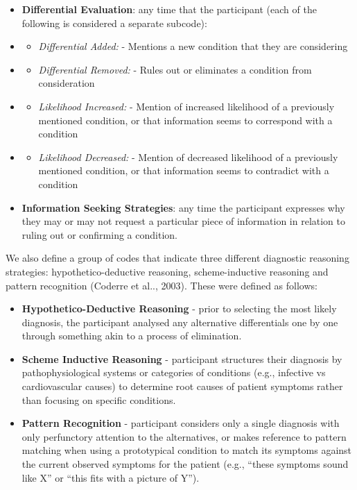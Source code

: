 \documentclass[a4paper, nobind]{templates/ociamthesis}
\providecommand{\tightlist}{%
  \setlength{\itemsep}{0pt}\setlength{\parskip}{0pt}}
\begin{document}
\begin{itemize}
\tightlist
\item
  \textbf{Differential Evaluation}: any time that the participant (each of the following is considered a separate subcode):
\item
  \begin{itemize}
  \tightlist
  \item
    \emph{Differential Added:} - Mentions a new condition that they are considering
  \end{itemize}
\item
  \begin{itemize}
  \tightlist
  \item
    \emph{Differential Removed:} - Rules out or eliminates a condition from consideration
  \end{itemize}
\item
  \begin{itemize}
  \tightlist
  \item
    \emph{Likelihood Increased:} - Mention of increased likelihood of a previously mentioned condition, or that information seems to correspond with a condition
  \end{itemize}
\item
  \begin{itemize}
  \tightlist
  \item
    \emph{Likelihood Decreased:} - Mention of decreased likelihood of a previously mentioned condition, or that information seems to contradict with a condition
  \end{itemize}
\item
  \textbf{Information Seeking Strategies}: any time the participant expresses why they may or may not request a particular piece of information in relation to ruling out or confirming a condition.
\end{itemize}

We also define a group of codes that indicate three different diagnostic reasoning strategies: hypothetico-deductive reasoning, scheme-inductive reasoning and pattern recognition (Coderre et al.., 2003). These were defined as follows:

\begin{itemize}
\tightlist
\item
  \textbf{Hypothetico-Deductive Reasoning} - prior to selecting the most likely diagnosis, the participant analysed any alternative differentials one by one through something akin to a process of elimination.
\item
  \textbf{Scheme Inductive Reasoning} - participant structures their diagnosis by pathophysiological systems or categories of conditions (e.g., infective vs cardiovascular causes) to determine root causes of patient symptoms rather than focusing on specific conditions.
\item
  \textbf{Pattern Recognition} - participant considers only a single diagnosis with only perfunctory attention to the alternatives, or makes reference to pattern matching when using a prototypical condition to match its symptoms against the current observed symptoms for the patient (e.g., ``these symptoms sound like X'' or ``this fits with a picture of Y'').
\end{itemize}
\end{document}
